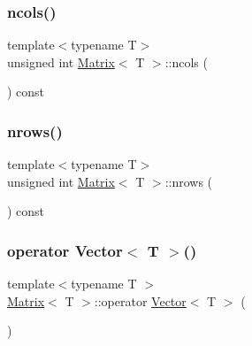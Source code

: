 \mbox{\label{classMatrix_aa62107f075998f969b39fcb1bef20c44}} 
\subsubsection{\texorpdfstring{ncols()}{ncols()}}
{\footnotesize\ttfamily template$<$typename T$>$ \\
unsigned int \mbox{\hyperlink{classMatrix}{Matrix}}$<$ T $>$\+::ncols (\begin{DoxyParamCaption}{ }\end{DoxyParamCaption}) const\hspace{0.3cm}{\ttfamily [inline]}}

\mbox{\label{classMatrix_ad025820349fa69f73f2da395af627741}} 
\subsubsection{\texorpdfstring{nrows()}{nrows()}}
{\footnotesize\ttfamily template$<$typename T$>$ \\
unsigned int \mbox{\hyperlink{classMatrix}{Matrix}}$<$ T $>$\+::nrows (\begin{DoxyParamCaption}{ }\end{DoxyParamCaption}) const\hspace{0.3cm}{\ttfamily [inline]}}

\mbox{\label{classMatrix_a8d390e8b2581c65774f58a0a3b716dcb}} 
\subsubsection{\texorpdfstring{operator Vector$<$ T $>$()}{operator Vector< T >()}}
{\footnotesize\ttfamily template$<$typename T $>$ \\
\mbox{\hyperlink{classMatrix}{Matrix}}$<$ T $>$\+::operator \mbox{\hyperlink{classVector}{Vector}}$<$ T $>$ (\begin{DoxyParamCaption}{ }\end{DoxyParamCaption})\hspace{0.3cm}{\ttfamily [inline]}}

